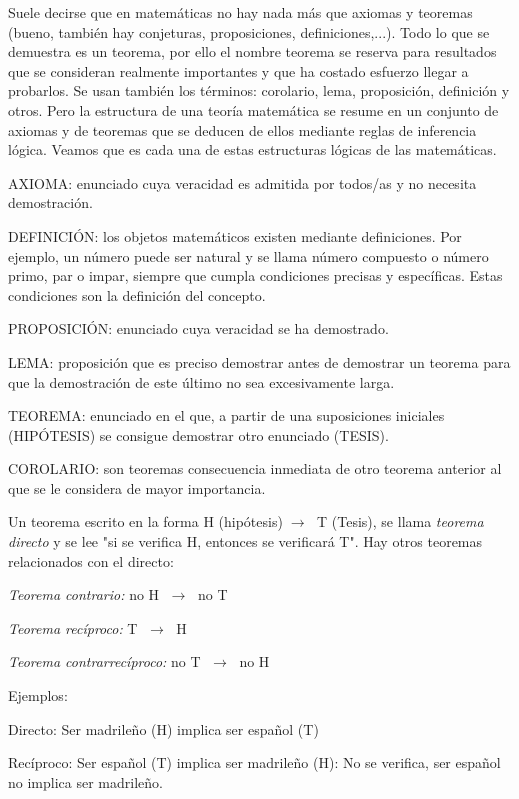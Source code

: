 Suele decirse que en matemáticas no hay nada más que	axiomas y teoremas (bueno, también hay conjeturas, proposiciones, definiciones,...). Todo lo que se demuestra es un teorema, por ello el nombre teorema se reserva para resultados que se consideran realmente importantes y que ha costado esfuerzo llegar a probarlos. Se usan también los términos: corolario, lema, proposición, definición y otros. Pero la estructura de una teoría matemática  se resume en un conjunto de axiomas y de teoremas que se deducen de ellos mediante reglas de inferencia lógica. Veamos que es cada una de estas estructuras lógicas de las matemáticas.
	
		AXIOMA: enunciado cuya veracidad es admitida por todos/as y no necesita demostración.
	
		DEFINICIÓN: los objetos matemáticos existen mediante definiciones. Por ejemplo, un número puede ser natural y se llama número compuesto o número primo, par o impar, siempre que cumpla condiciones precisas y específicas. Estas condiciones son la definición del concepto.
	
		PROPOSICIÓN: enunciado cuya veracidad se ha demostrado.
	
		LEMA: proposición que es preciso demostrar antes de demostrar un teorema para que la demostración de este último no sea excesivamente larga.
	
		TEOREMA: enunciado en el que, a partir de una suposiciones iniciales (HIPÓTESIS) se consigue demostrar otro enunciado (TESIS).
	
		COROLARIO: son teoremas consecuencia inmediata de otro teorema anterior al que se le considera de mayor importancia.
		
		 Un teorema escrito en la forma H (hipótesis)$\; \to\; $ T (Tesis), se llama \emph{teorema directo} y se lee "si se verifica H, entonces se verificará T". Hay otros teoremas relacionados con el directo:
		
		\emph{Teorema contrario:} no H $\; \to\; $ no T
		
		\emph{Teorema recíproco:} T $\; \to\; $ H
		
		\emph{Teorema contrarrecíproco:} no T $\; \to\; $ no H
		
		Ejemplos:
		
		\hspace{10mm} Directo: Ser madrileño (H) implica ser español (T)
		
		\hspace{10mm} Recíproco: Ser español (T) implica ser madrileño (H): No se verifica, ser español no implica ser madrileño.
		
